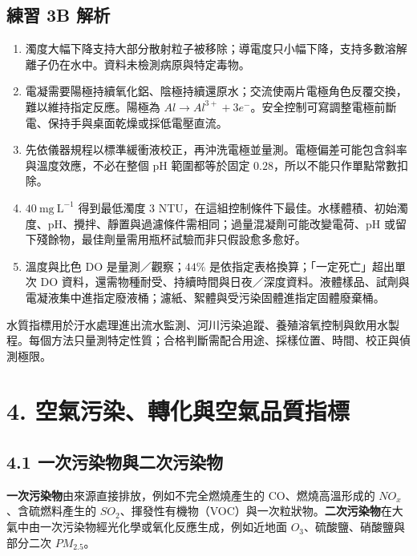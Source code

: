 \documentclass[11pt,a4paper]{article}
\providecommand{\tightlist}{%
  \setlength{\itemsep}{0pt}\setlength{\parskip}{0pt}}
\begin{document}
\subsection{練習 3B 解析}\label{ux7df4ux7fd2-3b-ux89e3ux6790}

\begin{enumerate}
\def\labelenumi{\arabic{enumi}.}
\tightlist
\item
  濁度大幅下降支持大部分散射粒子被移除；導電度只小幅下降，支持多數溶解離子仍在水中。資料未檢測病原與特定毒物。
\item
  電凝需要陽極持續氧化鋁、陰極持續還原水；交流使兩片電極角色反覆交換，難以維持指定反應。陽極為 \(Al\rightarrow Al^{3+}+3e^-\)。安全控制可寫調整電極前斷電、保持手與桌面乾燥或採低電壓直流。
\item
  先依儀器規程以標準緩衝液校正，再沖洗電極並量測。電極偏差可能包含斜率與溫度效應，不必在整個 pH 範圍都等於固定 \(0.28\)，所以不能只作單點常數扣除。
\item
  \(40\ \mathrm{mg\ L^{-1}}\) 得到最低濁度 \(3\) NTU，在這組控制條件下最佳。水樣體積、初始濁度、pH、攪拌、靜置與過濾條件需相同；過量混凝劑可能改變電荷、pH 或留下殘餘物，最佳劑量需用瓶杯試驗而非只假設愈多愈好。
\item
  溫度與比色 DO 是量測／觀察；\(44\%\) 是依指定表格換算；「一定死亡」超出單次 DO 資料，還需物種耐受、持續時間與日夜／深度資料。液體樣品、試劑與電凝液集中進指定廢液桶；濾紙、絮體與受污染固體進指定固體廢棄桶。
\end{enumerate}

水質指標用於汙水處理進出流水監測、河川污染追蹤、養殖溶氧控制與飲用水製程。每個方法只量測特定性質；合格判斷需配合用途、採樣位置、時間、校正與偵測極限。

\section{4. 空氣污染、轉化與空氣品質指標}\label{ux7a7aux6c23ux6c61ux67d3ux8f49ux5316ux8207ux7a7aux6c23ux54c1ux8ceaux6307ux6a19}

\subsection{4.1 一次污染物與二次污染物}\label{ux4e00ux6b21ux6c61ux67d3ux7269ux8207ux4e8cux6b21ux6c61ux67d3ux7269}

\textbf{一次污染物}由來源直接排放，例如不完全燃燒產生的 CO、燃燒高溫形成的 \(NO_x\)、含硫燃料產生的 \(SO_2\)、揮發性有機物（VOC）與一次粒狀物。\textbf{二次污染物}在大氣中由一次污染物經光化學或氧化反應生成，例如近地面 \(O_3\)、硫酸鹽、硝酸鹽與部分二次 \(PM_{2.5}\)。
\end{document}

